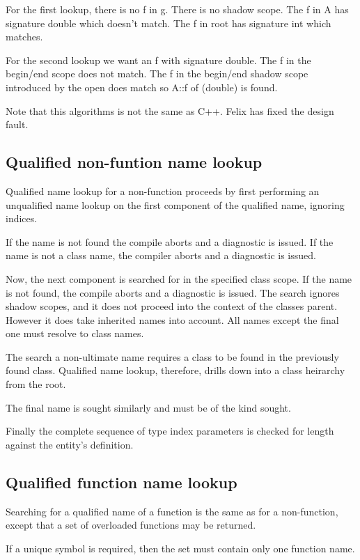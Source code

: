 \documentclass[oneside]{book}
\begin{document}
For the first lookup, there is no f in g.
There is no shadow scope.
The f in A has signature double which doesn't match.
The f in root has signature int which matches.

For the second lookup we want an f with signature double.
The f in the begin/end scope does not match.
The f in the begin/end shadow scope introduced by the open
does match so A::f of (double) is found.

Note that this algorithms is not the same as C++.
Felix has fixed the design fault.

   
\subsection{Qualified non-funtion name lookup}
Qualified name lookup for a non-function proceeds by
first performing an unqualified name lookup on the first
component of the qualified name, ignoring indices.

If the name is not found the compile aborts and a diagnostic
is issued. If the name is not a class name, the compiler aborts
and a diagnostic is issued.

Now, the next component is searched for in the
specified class scope. If the name is not found, the compile
aborts and a diagnostic is issued. The search ignores shadow
scopes, and it does not proceed into the context of the
classes parent. However it does take inherited names into account.
All names except the final one must resolve to class names.

The search a non-ultimate name requires a class to be found
in the previously found class. Qualified name lookup, therefore,
drills down into a class heirarchy from the root.

The final name is sought similarly and must be of the
kind sought.

Finally the complete sequence of type index parameters is checked
for length against the entity's definition.

\subsection{Qualified function name lookup}
Searching for a qualified name of a function is the same
as for a non-function, except that a set of overloaded
functions may be returned. 

If a unique symbol is required, then the set must contain
only one function name.
\end{document}
